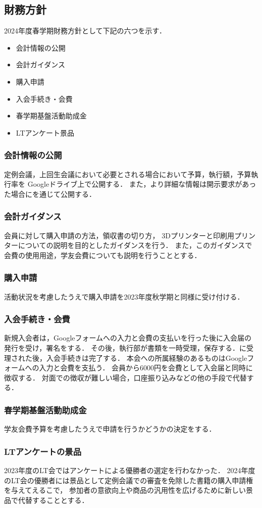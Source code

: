 \subsection*{財務方針}


2024年度春学期財務方針として下記の六つを示す．
\begin{itemize}
    \item 会計情報の公開
    \item 会計ガイダンス
    \item 購入申請
    \item 入会手続き・会費
    \item 春学期基盤活動助成金
    \item LTアンケート景品
\end{itemize}

\subsubsection*{会計情報の公開}
定例会議，上回生会議において必要とされる場合において予算，執行額，予算執行率を Googleドライブ上で公開する．
また，より詳細な情報は開示要求があった場合に\kaikeiStaff{}を通じて公開する．

\subsubsection*{会計ガイダンス}
会員に対して購入申請の方法，領収書の切り方， 3Dプリンターと印刷用プリンターについての説明を目的としたガイダンスを行う．
また，このガイダンスで会費の使用用途，学友会費についても説明を行うこととする．

\subsubsection*{購入申請}
活動状況を考慮したうえで購入申請を2023年度秋学期と同様に受け付ける．

\subsubsection*{入会手続き・会費}
新規入会者は，Googleフォームへの入力と会費の支払いを行った後に入会届の発行を受け，署名をする．
その後，執行部が書類を一時受理，保存する．\president{}に受理された後，入会手続きは完了する．
本会への所属経験のあるものはGoogleフォームへの入力と会費を支払う．
会員から6000円を会費として入会届と同時に徴収する．
対面での徴収が難しい場合，口座振り込みなどの他の手段で代替する．

\subsubsection*{春学期基盤活動助成金}
学友会費予算を考慮したうえで申請を行うかどうかの決定をする．

\subsubsection*{LTアンケートの景品}
2023年度のLT会ではアンケートによる優勝者の選定を行わなかった．
2024年度のLT会の優勝者には景品として定例会議での審査を免除した書籍の購入申請権を与えてえるこで，
参加者の意欲向上や商品の汎用性を広げるために新しい景品で代替することとする．

